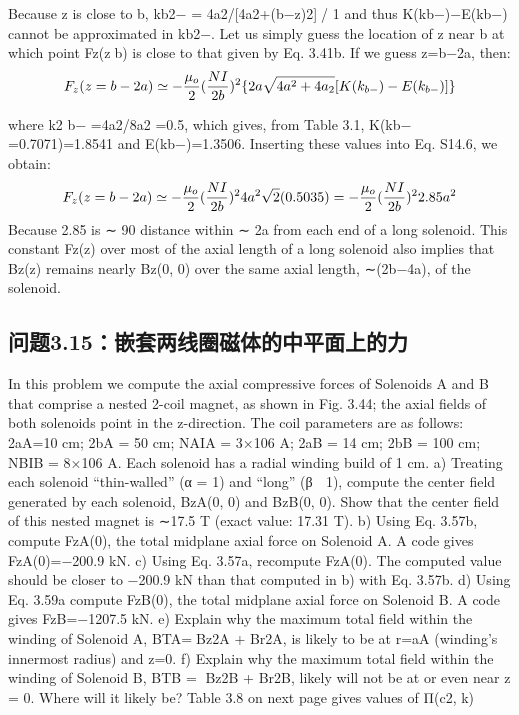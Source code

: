Because z is close to b, kb2− = 4a2/[4a2+(b−z)2]/ 1 and thus K(kb−)−E(kb−)
cannot be approximated in kb2−. Let us simply guess the location of z near b at
which point Fz(z∼b) is close to that given by Eq. 3.41b. If we guess z=b−2a, then:
$$
F_{z}(z=b-2a)\simeq-\frac{\mu_{o}}{2}(\frac{NI}{2b})^{2}\{2a\sqrt{4a^{2}+4a_{2}}[K(k_{b-})-E(k_{b-})]\}\\%
$$

where k2
b− =4a2/8a2 =0.5, which gives, from Table 3.1, K(kb− =0.7071)=1.8541
and E(kb−)=1.3506. Inserting these values into Eq. S14.6, we obtain:
$$
F_{z}(z=b-2a)\simeq-\frac{\mu_{o}}{2}(\frac{NI}{2b})^{2}4a^{2}\sqrt{2}(0.5035)\\
=-\frac{\mu_{o}}{2}(\frac{NI}{2b})^{2}2.85a^{2}\\%
$$
Because 2.85 is ∼ 90%
distance within ∼ 2a from each end of a long solenoid. This constant Fz(z) over
most of the axial length of a long solenoid also implies that Bz(z) remains nearly
Bz(0, 0) over the same axial length, ∼(2b−4a), of the solenoid.
\newpage



\subsection{问题3.15：嵌套两线圈磁体的中平面上的力}
In this problem we compute the axial compressive forces of Solenoids A and B that
comprise a nested 2-coil magnet, as shown in Fig. 3.44; the axial fields of both
solenoids point in the z-direction. The coil parameters are as follows: 2aA=10 cm;
2bA = 50 cm; NAIA = 3×106 A; 2aB = 14 cm; 2bB = 100 cm; NBIB = 8×106 A. Each
solenoid has a radial winding build of 1 cm.
a) Treating each solenoid “thin-walled” (α = 1) and “long” (β  1), compute
the center field generated by each solenoid, BzA(0, 0) and BzB(0, 0). Show
that the center field of this nested magnet is ∼17.5 T (exact value: 17.31 T).
b) Using Eq. 3.57b, compute FzA(0), the total midplane axial force on Solenoid
A. A code gives FzA(0)=−200.9 kN.
c) Using Eq. 3.57a, recompute FzA(0). The computed value should be closer to
−200.9 kN than that computed in b) with Eq. 3.57b.
d) Using Eq. 3.59a compute FzB(0), the total midplane axial force on Solenoid
B. A code gives FzB=−1207.5 kN.
e) Explain why the maximum total field within the winding of Solenoid A,
BTA=Bz2A + Br2A, is likely to be at r=aA (winding’s innermost radius) and
z=0.
f) Explain why the maximum total field within the winding of Solenoid B,
BTB = Bz2B + Br2B, likely will not be at or even near z = 0. Where will it
likely be?
Table 3.8 on next page gives values of Π(c2, k)

